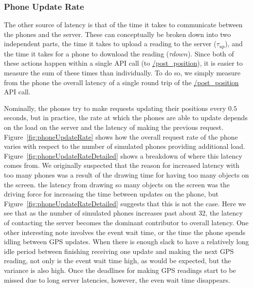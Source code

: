 \documentclass{acm_proc_article-sp}
\begin{document}
\subsubsection{Phone Update Rate}
The other source of latency is that of the time it takes to communicate between the phones and the server. These can conceptually be broken down into two independent parts, the time it takes to upload a reading to the server  ($\tau_{up}$), and the time it takes for a phone to download the reading ($\tau{down}$). Since both of these actions happen within a single API call (to \url{/post_position}), it is easier to measure the sum of these times than individually. To do so, we simply measure from the phone the overall latency of a single round trip of the \url{/post_position} API call.

Nominally, the phones try to make requests updating their positions every $0.5$ seconds, but in practice, the rate at which the phones are able to update depends on the load on the server and the latency of making the previous request. Figure~\ref{fig:phoneUpdateRate} shows how the overall request rate of the phone varies with respect to the number of simulated phones providing additional load.
Figure~\ref{fig:phoneUpdateRateDetailed} shows a breakdown of where this latency comes from. We originally suspected that the reason for increased latency with too many phones was a result of the drawing time for having too many objects on the screen. the latency from drawing so many objects on the screen was the driving force for increasing the time between updates on the phone, but Figure~\ref{fig:phoneUpdateRateDetailed} suggests that this is not the case.  Here we see that as the number of simulated phones increases past about 32, the latency of contacting the server becomes the dominant contributor to overall latency. One other interesting note involves the event wait time, or the time the phone spends idling between GPS updates.  When there is enough slack to have a relatively long idle period between finishing receiving one update and making the next GPS reading, not only is the event wait time high, as would be expected, but the variance is also high. Once the deadlines for making GPS readings start to be missed due to long server latencies, however, the even wait time disappears.
\end{document}
